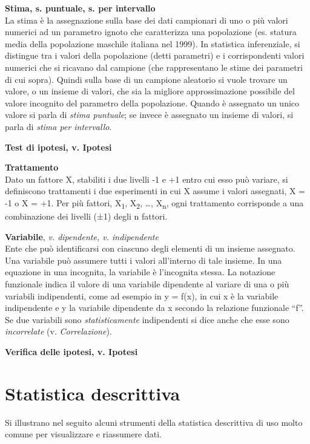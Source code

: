 \documentclass[
  11pt,
]{book}
\begin{document}
\textbf{Stima, s. puntuale, s. per intervallo}\\
La stima è la assegnazione sulla base dei dati campionari di uno o più valori numerici ad un parametro ignoto che caratterizza una popolazione (es. statura media della popolazione maschile italiana nel 1999).
In statistica inferenziale, si distingue tra i valori della popolazione (detti parametri) e i corrispondenti valori numerici che si ricavano dal campione (che rappresentano le stime dei parametri di cui sopra).
Quindi sulla base di un campione aleatorio si vuole trovare un valore, o un insieme di valori, che sia la migliore approssimazione possibile del valore incognito del parametro della popolazione.
Quando è assegnato un unico valore si parla di \emph{stima puntuale}; se invece è assegnato un insieme di valori, si parla di \emph{stima per intervallo}.

\textbf{Test di ipotesi, v. Ipotesi}

\textbf{Trattamento}\\
Dato un fattore X, stabiliti i due livelli -1 e +1 entro cui esso può variare, si definiscono trattamenti i due esperimenti in cui X assume i valori assegnati, X = -1 o X = +1.
Per più fattori, X\textsubscript{1}, X\textsubscript{2}, \ldots, X\textsubscript{n}, ogni trattamento corrisponde a una combinazione dei livelli (±1) degli n fattori.

\textbf{Variabile}, \emph{v. dipendente, v. indipendente}\\
Ente che può identificarsi con ciascuno degli elementi di un insieme assegnato.
Una variabile può assumere tutti i valori all'interno di tale insieme.
In una equazione in una incognita, la variabile è l'incognita stessa.
La notazione funzionale indica il valore di una variabile dipendente al variare di una o più variabili indipendenti, come ad esempio in y = f(x), in cui x è la variabile indipendente e y la variabile dipendente da x secondo la relazione funzionale ``f''.
Se due variabili sono \emph{statisticamente} indipendenti si dice anche che esse sono \emph{incorrelate} (v. \emph{Correlazione}).

\textbf{Verifica delle ipotesi, v. Ipotesi}

\hypertarget{statistica-descrittiva}{%
\chapter{Statistica descrittiva}\label{statistica-descrittiva}}

Si illustrano nel seguito alcuni strumenti della statistica descrittiva di uso molto comune per visualizzare e riassumere dati.
\end{document}
